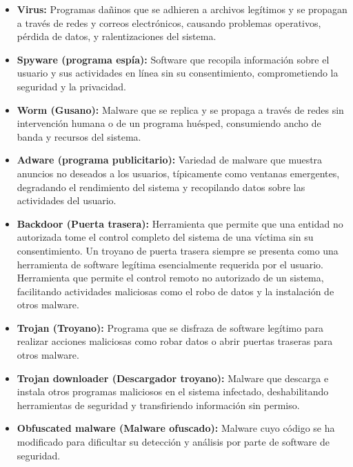 \begin{itemize}
    \item \textbf{Virus:} Programas dañinos que se adhieren a archivos legítimos y se propagan a través de redes y correos electrónicos, causando problemas operativos, pérdida de datos, y ralentizaciones del sistema.
    
    \item \textbf{Spyware (programa espía):} Software que recopila información sobre el usuario y sus actividades en línea sin su consentimiento, comprometiendo la seguridad y la privacidad.
    
    \item \textbf{Worm (Gusano):} Malware que se replica y se propaga a través de redes sin intervención humana o de un programa huésped, consumiendo ancho de banda y recursos del sistema.
    
    \item \textbf{Adware (programa publicitario):} Variedad de malware que muestra anuncios no deseados a los usuarios, típicamente como ventanas emergentes, degradando el rendimiento del sistema y recopilando datos sobre las actividades del usuario.
    
    \item \textbf{Backdoor (Puerta trasera):} Herramienta que permite que una entidad no autorizada tome el control completo del sistema de una víctima sin su consentimiento. Un troyano de puerta trasera siempre se presenta como una herramienta de software legítima esencialmente requerida por el usuario. Herramienta que permite el control remoto no autorizado de un sistema, facilitando actividades maliciosas como el robo de datos y la instalación de otros malware.
    
    \item \textbf{Trojan (Troyano):} Programa que se disfraza de software legítimo para realizar acciones maliciosas como robar datos o abrir puertas traseras para otros malware.
    
    \item \textbf{Trojan downloader (Descargador troyano):} Malware que descarga e instala otros programas maliciosos en el sistema infectado, deshabilitando herramientas de seguridad y transfiriendo información sin permiso.
    
    \item \textbf{Obfuscated malware (Malware ofuscado):} Malware cuyo código se ha modificado para dificultar su detección y análisis por parte de software de seguridad.
\end{itemize}

